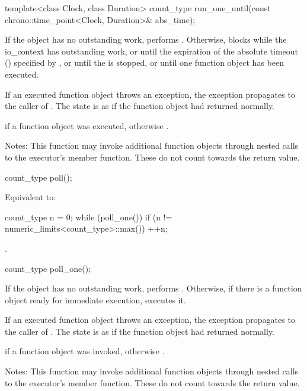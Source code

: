 %
\begin{itemdecl}
template<class Clock, class Duration>
  count_type run_one_until(const chrono::time_point<Clock, Duration>& abs_time);
\end{itemdecl}

\begin{itemdescr}
\pnum
\effects If the  object has no outstanding work, performs . Otherwise, blocks while the io_context has outstanding work, or until the expiration of the absolute timeout () specified by , or until the  is stopped, or until one function object has been executed.

\pnum
If an executed function object throws an exception, the exception propagates to the caller of . The  state is as if the function object had returned normally.

\pnum
\returns {} if a function object was executed, otherwise .

\pnum
Notes: This function may invoke additional function objects through nested calls to the  executor's  member function. These do not count towards the return value.
\end{itemdescr}

%
\begin{itemdecl}
count_type poll();
\end{itemdecl}

\begin{itemdescr}
\pnum
\effects Equivalent to: 
\begin{codeblock}
count_type n = 0;
while (poll_one())
  if (n != numeric_limits<count_type>::max())
    ++n;
\end{codeblock}


\pnum
\returns {}.
\end{itemdescr}

%
\begin{itemdecl}
count_type poll_one();
\end{itemdecl}

\begin{itemdescr}
\pnum
\effects If the  object has no outstanding work, performs . Otherwise, if there is a function object ready for immediate execution, executes it.

\pnum
If an executed function object throws an exception, the exception propagates to the caller of . The  state is as if the function object had returned normally.

\pnum
\returns {} if a function object was invoked, otherwise .

\pnum
Notes: This function may invoke additional function objects through nested calls to the  executor's  member function. These do not count towards the return value.
\end{itemdescr}

